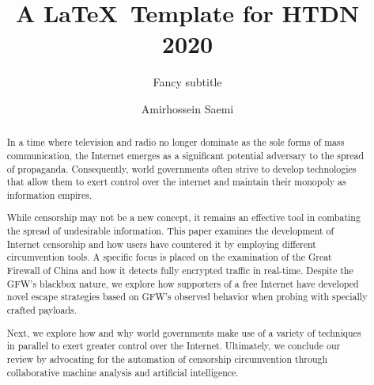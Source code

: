 \documentclass[10pt,sigconf]{acmart}
\begin{document}
\title{A \LaTeX\ Template for HTDN 2020}

\subtitle{Fancy subtitle}
 \author{Amirhossein Saemi}


\begin{abstract}
In a time where television and radio no longer dominate as the sole forms of mass communication, the Internet emerges as a significant potential adversary to the spread of propaganda. Consequently, world governments often strive to develop technologies that allow them to exert control over the internet and maintain their monopoly as information empires. 

While censorship may not be a new concept, it remains an effective tool in combating the spread of undesirable information. This paper examines the development of Internet censorship and how users have countered it by employing different circumvention tools. A specific focus is placed on the examination of the Great Firewall of China and how it detects fully encrypted traffic in real-time. Despite the GFW's blackbox nature, we explore how supporters of a free Internet have developed novel escape strategies based on GFW's observed behavior when probing with specially crafted payloads.

Next, we explore how and why world governments make use of a variety of techniques in parallel to exert greater control over the Internet. Ultimately, we conclude our review by advocating for the automation of censorship circumvention through collaborative machine analysis and artificial intelligence.
\end{abstract}

\maketitle





\end{document}
